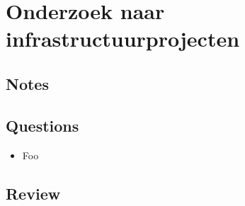 \chapter{Onderzoek naar infrastructuurprojecten \cite{commissie-duivesteijn}}
\section{Notes}

\section{Questions}
\begin{itemize}
  \item Foo
\end{itemize}

\section{Review}
